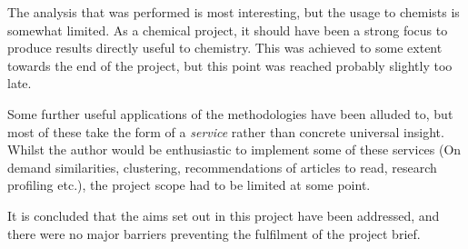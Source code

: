 The analysis that was performed is most interesting, but the usage to chemists is somewhat limited. As a chemical project, it should have been a strong focus to produce results directly useful to chemistry. This was achieved to some extent towards the end of the project, but this point was reached probably slightly too late.

Some further useful applications of the methodologies have been alluded to, but most of these take the form of a \emph{service} rather than concrete universal insight. Whilst the author would be enthusiastic to implement some of these services (On demand similarities, clustering, recommendations of articles to read, research profiling etc.), the project scope had to be limited at some point.

It is concluded that the aims set out in this project have been addressed, and there were no major barriers preventing the fulfilment of the project brief. 